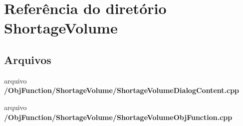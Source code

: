 \section{Referência do diretório Shortage\+Volume}
\label{dir_db6f0469cc8cb816ea3ee45eff03ce08}
\subsection*{Arquivos}
\begin{DoxyCompactItemize}
\item 
arquivo {\bf /\+Obj\+Function/\+Shortage\+Volume/\+Shortage\+Volume\+Dialog\+Content.\+cpp}
\item 
arquivo {\bf /\+Obj\+Function/\+Shortage\+Volume/\+Shortage\+Volume\+Obj\+Function.\+cpp}
\end{DoxyCompactItemize}

